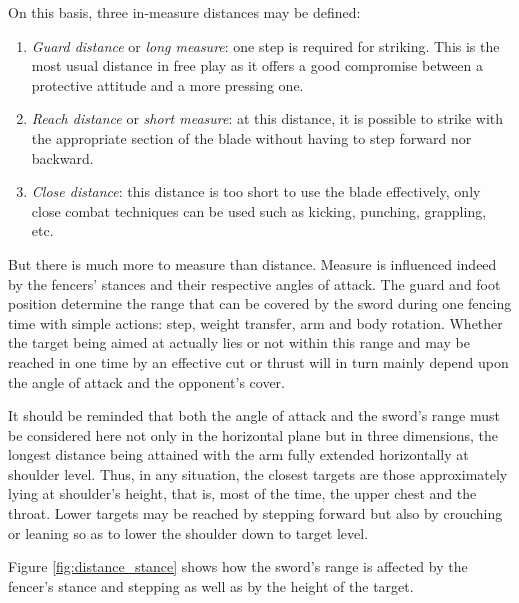 On this basis, three in-measure distances may be defined:
\begin{enumerate}
\item \emph{Guard distance} or \emph{long measure}: one step is required for striking. This is the most usual distance in free play as it offers a good compromise between a protective attitude and a more pressing one.
\item \emph{Reach distance} or \emph{short measure}: at this distance, it is possible to strike with the appropriate section of the blade without having to step forward nor backward.
\item \emph{Close distance}: this distance is too short to use the blade effectively, only close combat techniques can be used such as kicking, punching, grappling, etc.
\end{enumerate}

But there is much more to measure than distance.
Measure is influenced indeed by the fencers' stances and their respective angles of attack.
The guard and foot position determine the range that can be covered by the sword during one fencing time with simple actions: step, weight transfer, arm and body rotation. 
Whether the target being aimed at actually lies or not within this range and may be reached in one time by an effective cut or thrust will in turn mainly depend upon the angle of attack and the opponent's cover.

It should be reminded that both the angle of attack and the sword's range must be considered here not only in the horizontal plane but in three dimensions, the longest distance being attained with the arm fully extended horizontally at shoulder level.
Thus, in any situation, the closest targets are those approximately lying at shoulder's height, that is, most of the time, the upper chest and the throat.
Lower targets may be reached by stepping forward but also by crouching or leaning so as to lower the shoulder down to target level.

Figure \ref{fig:distance_stance} shows how the sword's range is affected by the fencer's stance and stepping as well as by the height of the target.

